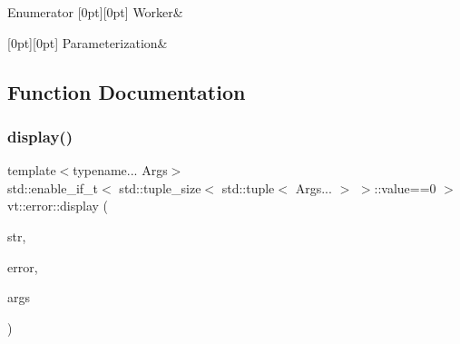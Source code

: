 \begin{DoxyEnumFields}{Enumerator}
[0pt][0pt]{}\mbox{\label{namespacevt_1_1error_a4ec28d13574cae1ad715adcf479d3f12a62efb9ec331e364b96efe68c8b03ca20}} 
Worker&\\
\hline

[0pt][0pt]{}\mbox{\label{namespacevt_1_1error_a4ec28d13574cae1ad715adcf479d3f12a8288407af7a0af8cffd175e6a8a6e992}} 
Parameterization&\\
\hline

\end{DoxyEnumFields}


\subsection{Function Documentation}
\mbox{\label{namespacevt_1_1error_a1b5e48ed4efcd084a1f7b0ee9bd65b14}} 
\subsubsection{\texorpdfstring{display()}{display()}\hspace{0.1cm}{\footnotesize\ttfamily [1/2]}}
{\footnotesize\ttfamily template$<$typename... Args$>$ \\
std\+::enable\+\_\+if\+\_\+t$<$ std\+::tuple\+\_\+size$<$ std\+::tuple$<$ Args... $>$ $>$\+::value==0 $>$ vt\+::error\+::display (\begin{DoxyParamCaption}\item[{std\+::string const \&}]{str,  }\item[{\hyperlink{namespacevt_a793764d753923abc3d32929870beb485}{Error\+Code\+Type}}]{error,  }\item[{Args \&\&...}]{args }\end{DoxyParamCaption})\hspace{0.3cm}{\ttfamily [inline]}}

\mbox{\label{namespacevt_1_1error_a37c5633fbfd11a19486f467819a330f5}} 
